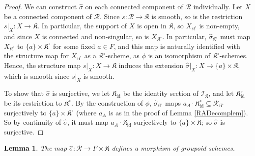 \documentclass{amsart}
\newtheorem{lemma}[theorem]{Lemma}
\theoremstyle{remark}
\numberwithin{theorem}{section}
\numberwithin{equation}{section}
\begin{document}
\begin{proof}
We can construct $\hat{\sigma}$ on each connected component of $\mathcal R$ individually. Let $X$ be a connected component of $\mathcal R$. Since $s:\mathcal R \rightarrow \mathfrak{K}$ is smooth, so is the restriction $s|_X:X \rightarrow \mathfrak{K}$. In particular, the support of $X$ is open in $\mathfrak{K}$, so $X_{\mathfrak{K}^\circ}$ is non-empty, and since $X$ is connected and non-singular, so is $X_{\mathfrak{K}^\circ}$. In particular, $\hat{\sigma}_{\mathfrak{K}^\circ}$ must map $X_{\mathfrak{K}^\circ}$ to $\{a\} \times \mathfrak{K}^\circ$ for some fixed $a \in F$, and this map is naturally identified with the structure map for $X_{\mathfrak{K}^\circ}$ as a $\mathfrak{K}^\circ$-scheme, as $\phi$ is an isomorphism of $\mathfrak{K}^\circ$-schemes. Hence, the structure map $s|_X:X\rightarrow \mathfrak{K}$ induces the extension $\hat{\sigma}|_X:X \rightarrow \{a\} \times \mathfrak{K}$, which is smooth since $s|_X$ is smooth.

To show that $\hat{\sigma}$ is surjective, we let $\mathfrak{K}_{\text{id}}$ be the identity section of $\mathcal I_{\mathfrak{K}}$, and let $\mathfrak{K}_{\text{id}}^\circ$ be its restriction to $\mathfrak{K}^\circ$. By the construction of $\phi$, $\hat{\sigma}_{\mathfrak{K}^\circ}$ maps $a_A\cdot\mathfrak{K}_{\text{id}}^\circ \subseteq \mathcal R_{\mathfrak{K}^\circ}$ surjectively to $\{a\} \times \mathfrak{K}^\circ$ (where $a_A$ is as in the proof of Lemma \ref{RADecomplem}). So by continuity of $\hat{\sigma}$, it must map $a_A\cdot\mathfrak{K}_{\text{id}}$ surjectively to $\{a\} \times \mathfrak{K}$; so $\hat{\sigma}$ is surjective.
\end{proof}

\begin{lemma}\label{RAQSGroupoidlem}
    The map $\hat{\sigma}:\mathcal R \rightarrow F \times \mathfrak{K}$ defines a morphism of groupoid schemes.
\end{lemma}
\end{document}
